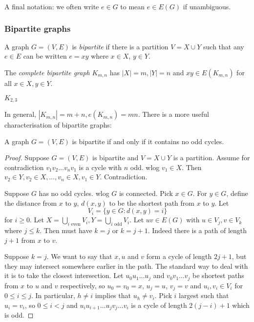 \documentclass[a4paper]{article}
\begin{document}
A final notation: we often write \(e \in G\) to mean \(e \in E(G)\) if unambiguous.

\subsubsection{Bipartite graphs}

\begin{definition}
  A graph \(G = (V, E)\) is \emph{bipartite} if there is a partition \(V = X \cup Y\) such that any \(e \in E\) can be written \(e = xy\) where \(x \in X\), \(y \in Y\).

  The \emph{complete bipartite graph} \(K_{m, n}\) has \(|X| = m, |Y| = n\) and \(xy \in E(K_{m, n})\) for all \(x \in X, y \in Y\).
\end{definition}

\begin{eg}
  \(K_{2, 3}\)
  \iffalse
  \begin{center}
    \begin{tikzpicture}
      \Vertices{1, 2}
    \end{tikzpicture}
  \end{center}
  \fi
\end{eg}

In general, \(|K_{m, n}| = m + n, e(K_{m, n}) = mn\). There is a more useful characterisation of bipartite graphs:

\begin{proposition}
  A graph \(G = (V, E)\) is bipartite if and only if it contains no odd cycles.
\end{proposition}

\begin{proof}
  Suppose \(G = (V, E)\) is bipartite and \(V = X \cup Y\) is a partition. Assume for contradiction \(v_1v_2 \dots v_nv_1\) is a cycle with \(n\) odd. wlog \(v_1 \in X\). Then \(v_2 \in Y, v_2 \in X, \dots, v_n \in X, v_1 \in Y\). Contradiction.

  Suppose \(G\) has no odd cycles. wlog \(G\) is connected. Pick \(x \in G\). For \(y \in G\), define the distance from \(x\) to \(y\), \(d(x, y)\) to be the shortest path from \(x\) to \(y\). Let
  \[
    V_i = \{y \in G: d(x, y) = i\}
  \]
  for \(i \geq 0\). Let \(X = \bigcup_{i \text{ even}} V_i, Y = \bigcup_{i \text{ odd}} V_i\). Let \(uv \in E(G)\) with \(u \in V_j, v \in V_k\) where \(j \leq k\). Then must have \(k = j\) or \(k = j + 1\). Indeed there is a path of length \(j + 1\) from \(x\) to \(v\). 

  Suppose \(k = j\). We want to say that \(x, u\) and \(v\) form a cycle of length \(2j + 1\), but they may intersect somewhere earlier in the path. The standard way to deal with it is to take the closest intersection. Let \(u_0u_1 \dots u_j\) and \(v_0v_1 \dots v_j\) be shortest paths from \(x\) to \(u\) and \(v\) respectively, so \(u_0 = v_0 = x\), \(u_j = u\), \(v_j = v\) and \(u_i, v_i \in V_i\) for \(0 \leq i \leq j\). In particular, \(h \neq i\) implies that \(u_h \neq v_i\). Pick \(i\) largest such that \(u_i = v_i\), so \(0 \leq i < j\) and \(u_iu_{i + 1} \dots u_j v_j \dots v_i\) is a cycle of length \(2(j - i) + 1\) which is odd.
\end{proof}
\end{document}
